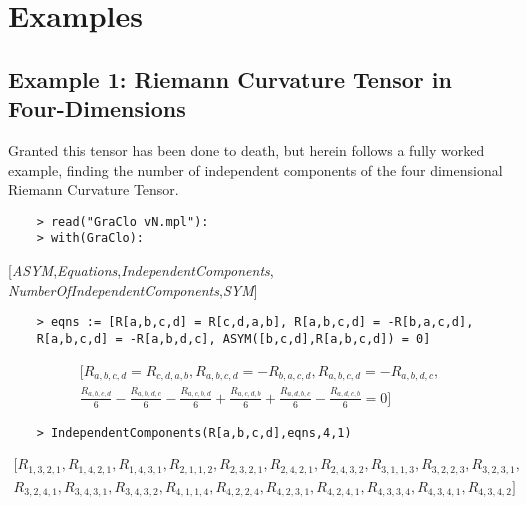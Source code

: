 \documentclass{article}
\begin{document}
\section*{Examples}
\subsection*{Example 1: Riemann Curvature Tensor in Four-Dimensions}
Granted this tensor has been done to death, but herein follows a fully worked example, finding the number of independent components of the four dimensional Riemann Curvature Tensor. 

\begin{verbatim}
    > read("GraClo vN.mpl"):
    > with(GraClo):
\end{verbatim}
[{\it ASYM},{\it Equations},{\it IndependentComponents},{\it 
NumberOfIndependentComponents},{\it SYM}]
\begin{verbatim}
    > eqns := [R[a,b,c,d] = R[c,d,a,b], R[a,b,c,d] = -R[b,a,c,d],
    R[a,b,c,d] = -R[a,b,d,c], ASYM([b,c,d],R[a,b,c,d]) = 0]
\end{verbatim}
\begin{equation*}
\begin{split}
[R_{{a,b,c,d}}=R_{{c,d,a,b}},R_{{a,b,c,d}}=-R_{{b,a,c,d}},R_{{a,b,c,d}
}=-R_{{a,b,d,c}},\\{\frac {R_{{a,b,c,d}}}{6}}-{\frac {R_{{a,b,d,c}}}{6}}
-{\frac {R_{{a,c,b,d}}}{6}}+{\frac {R_{{a,c,d,b}}}{6}}+{\frac {R_{{a,d
,b,c}}}{6}}-{\frac {R_{{a,d,c,b}}}{6}}=0]    \end{split}
\end{equation*}
\begin{verbatim}
    > IndependentComponents(R[a,b,c,d],eqns,4,1)
\end{verbatim}
\begin{equation*}
    \begin{split}
[R_{{1,3,2,1}},R_{{1,4,2,1}},R_{{1,4,3,1}},R_{{2,1,1,2}},R_{{2,3,2,1}}
,R_{{2,4,2,1}},R_{{2,4,3,2}},R_{{3,1,1,3}},R_{{3,2,2,3}},R_{{3,2,3,1}}
,\\R_{{3,2,4,1}},R_{{3,4,3,1}},R_{{3,4,3,2}},R_{{4,1,1,4}},R_{{4,2,2,4}}
,R_{{4,2,3,1}},R_{{4,2,4,1}},R_{{4,3,3,4}},R_{{4,3,4,1}},R_{{4,3,4,2}}
]
\end{split}
\end{equation*}
\end{document}
